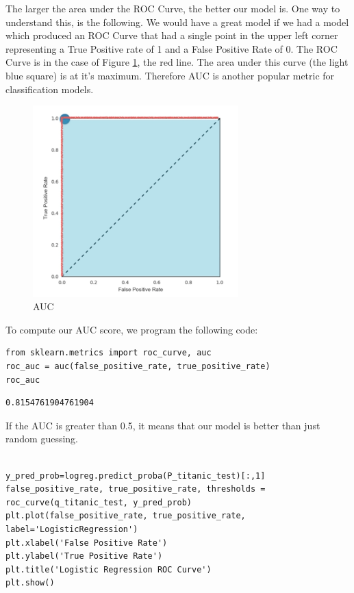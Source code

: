\documentclass[11pt]{article}
\begin{document}
The larger the area under the ROC Curve, the better our model is. One way to understand this, is the following. We would have a great model if we had a model which produced an ROC Curve that had a single point in the upper left corner representing a True Positive rate of 1 and a False Positive Rate of 0. The ROC Curve is in the case of Figure \ref{tab:auc}, the red line. The area under this curve (the light blue square) is at it's maximum. Therefore AUC is another popular metric for classification  models. 

\begin{figure}[htbp]
\centering
\includegraphics[width=300px]{./AUC2.png}
\caption{\label{tab:auc}
AUC}
\end{figure}

To compute our AUC score, we program the following code: 
\begin{verbatim}
from sklearn.metrics import roc_curve, auc
roc_auc = auc(false_positive_rate, true_positive_rate)
roc_auc
\end{verbatim}

\begin{verbatim}
0.8154761904761904
\end{verbatim}

If the AUC is greater than 0.5, it means that our model is better than just random guessing. 
















\begin{verbatim}

y_pred_prob=logreg.predict_proba(P_titanic_test)[:,1]
false_positive_rate, true_positive_rate, thresholds = roc_curve(q_titanic_test, y_pred_prob)
plt.plot(false_positive_rate, true_positive_rate, label='LogisticRegression')
plt.xlabel('False Positive Rate')
plt.ylabel('True Positive Rate')
plt.title('Logistic Regression ROC Curve')
plt.show()

\end{verbatim}
\end{document}
